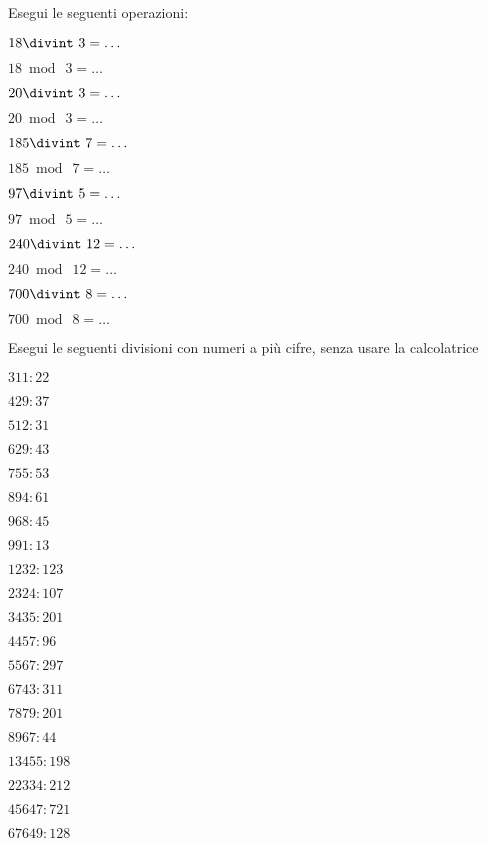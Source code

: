 \begin{esercizio}
\label{ese:1.6}
 Esegui le seguenti operazioni:
\begin{multicols}{3}
 \begin{enumeratea}
 \item $18\divint~3=\ldots$
 \item $18\bmod~3=\ldots$
 \item $20\divint~3=\ldots$
 \item $20\bmod~3=\ldots$
 \item $185\divint~7=\ldots$
 \item $185\bmod~7=\ldots$
 \item $97\divint~5=\ldots$
 \item $97\bmod~5=\ldots$
 \item $240\divint~12=\ldots$
 \item $240\bmod~12=\ldots$
 \item $700\divint~8=\ldots$
 \item $700\bmod~8=\ldots$
 \end{enumeratea}
\end{multicols}
\end{esercizio}


\begin{esercizio}
\label{ese:1.7}
 Esegui le seguenti divisioni con numeri a più cifre, senza usare la calcolatrice
\begin{multicols}{4}
 \begin{enumeratea}
 \item $311:22$
 \item $429:37$
 \item $512:31$
 \item $629:43$
 \item $755:53$
 \item $894:61$
 \item $968:45$
 \item $991:13$
 \item $1232:123$
 \item $2324:107$
 \item $3435:201$
 \item $4457:96$
 \item $5567:297$
 \item $6743:311$
 \item $7879:201$
 \item $8967:44$
 \item $13455:198$
 \item $22334:212$
 \item $45647:721$
 \item $67649:128$
 \end{enumeratea}
\end{multicols}
\end{esercizio}

